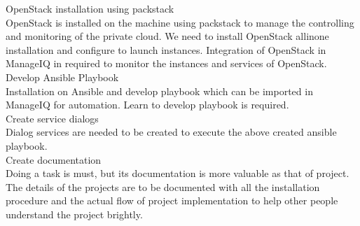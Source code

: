 \documentclass[a4paper,12pt]{report}
\begin{document}
OpenStack installation using packstack\\

OpenStack is installed on the machine using packstack to manage the controlling and monitoring of the private cloud. We need to install OpenStack allinone installation and configure to launch instances. Integration of OpenStack in ManageIQ in required to monitor the instances and services of OpenStack.\\

Develop Ansible Playbook\\

Installation on Ansible and develop playbook which can be imported in ManageIQ for automation. Learn to develop playbook is required. \\

Create service dialogs\\
Dialog services are needed to be created to execute the above created ansible playbook.\\

Create documentation\\
Doing a task is must, but its documentation is more valuable as that of project. The details of the projects are to be documented with all the installation procedure and the actual flow of project implementation to help other people understand the project brightly.
\end{document}
